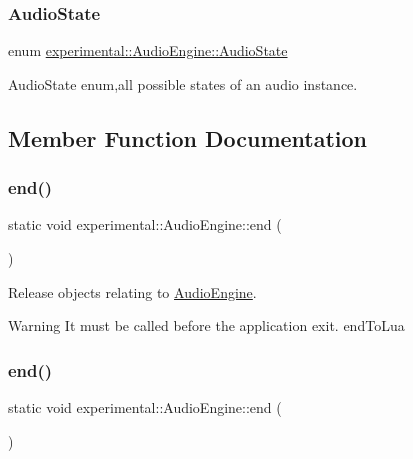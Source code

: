 \subsubsection{\texorpdfstring{Audio\+State}{AudioState}\hspace{0.1cm}{\footnotesize\ttfamily [2/2]}}
{\footnotesize\ttfamily enum \hyperlink{classexperimental_1_1AudioEngine_ab7becf9cab1f5e4cac089a1f6e3785e6}{experimental\+::\+Audio\+Engine\+::\+Audio\+State}\hspace{0.3cm}{\ttfamily [strong]}}

Audio\+State enum,all possible states of an audio instance. 

\subsection{Member Function Documentation}
\mbox{\label{classexperimental_1_1AudioEngine_a17ea6cda24d6c4d951d5b60b6d2afca0}} 
\subsubsection{\texorpdfstring{end()}{end()}\hspace{0.1cm}{\footnotesize\ttfamily [1/2]}}
{\footnotesize\ttfamily static void experimental\+::\+Audio\+Engine\+::end (\begin{DoxyParamCaption}{ }\end{DoxyParamCaption})\hspace{0.3cm}{\ttfamily [static]}}

Release objects relating to \hyperlink{classexperimental_1_1AudioEngine}{Audio\+Engine}.

\begin{DoxyWarning}{Warning}
It must be called before the application exit.  end\+To\+Lua 
\end{DoxyWarning}
\mbox{\label{classexperimental_1_1AudioEngine_a17ea6cda24d6c4d951d5b60b6d2afca0}} 
\subsubsection{\texorpdfstring{end()}{end()}\hspace{0.1cm}{\footnotesize\ttfamily [2/2]}}
{\footnotesize\ttfamily static void experimental\+::\+Audio\+Engine\+::end (\begin{DoxyParamCaption}{ }\end{DoxyParamCaption})\hspace{0.3cm}{\ttfamily [static]}}

